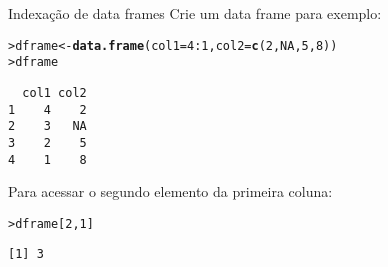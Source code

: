 \documentclass[10pt,handout]{beamer}\usepackage{graphicx, color}
\makeatletter
\newcommand{\hlfunctioncall}[1]{\textcolor[rgb]{0,0,0.545098039215686}{\textbf{#1}}}%
\newenvironment{kframe}{%
 \def\at@end@of@kframe{}%
 \ifinner\ifhmode%
  \def\at@end@of@kframe{\end{minipage}}%
  \begin{minipage}{\columnwidth}%
 \fi\fi%
 \def\FrameCommand##1{\hskip\@totalleftmargin \hskip-\fboxsep
 \colorbox{shadecolor}{##1}\hskip-\fboxsep
     \hskip-\linewidth \hskip-\@totalleftmargin \hskip\columnwidth}%
 \MakeFramed {\advance\hsize-\width
   \@totalleftmargin\z@ \linewidth\hsize
   \@setminipage}}%
 {\par\unskip\endMakeFramed%
 \at@end@of@kframe}
\newenvironment{knitrout}{}{} %
\makeatother
\begin{document}
\begin{frame}[fragile=singleslide]{Indexação de data frames}
Crie um data frame para exemplo:
\begin{knitrout}\small
{}\color{fgcolor}\begin{kframe}
\begin{alltt}
> dframe <- \hlfunctioncall{data.frame}(col1 = 4:1, col2 = \hlfunctioncall{c}(2,NA,5,8))
> dframe
\end{alltt}
\begin{verbatim}
  col1 col2
1    4    2
2    3   NA
3    2    5
4    1    8
\end{verbatim}
\end{kframe}
\end{knitrout}

Para acessar o segundo elemento da primeira coluna:
\begin{knitrout}\small
{}\color{fgcolor}\begin{kframe}
\begin{alltt}
> dframe[2,1]
\end{alltt}
\begin{verbatim}
[1] 3
\end{verbatim}
\end{kframe}
\end{knitrout}

\end{frame}
\end{document}
